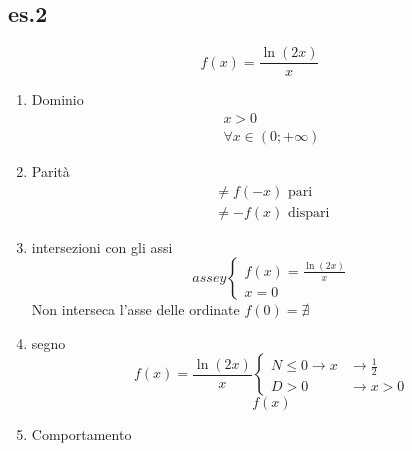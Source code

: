 \documentclass{article}
\begin{document}
	\subsection{es.2}
		\begin{equation*}
			f(x)=\frac{\ln(2x)}{x}
		\end{equation*}
		\begin{enumerate}
			\item Dominio
				\begin{equation*}
					\begin{matrix}
						x>0\\
						\forall x\in (0; +\infty)
					\end{matrix}
				\end{equation*}
			\item Parità
				\begin{equation*}
					\begin{matrix}
						\neq f(-x) \text{ pari}\\
						\neq -f(x) \text{ dispari}
					\end{matrix}
				\end{equation*}
			\item intersezioni con gli assi
				\begin{equation*}
					asse y\begin{cases}
						f(x)=\frac{\ln(2x)}{x}\\
						x=0
					\end{cases}
				\end{equation*}
				Non interseca l'asse delle ordinate $f(0)=\nexists$
			\item segno
				\begin{equation}
					f(x)=\frac{\ln(2x)}{x}\begin{cases}
						N \leq 0 \to x&\to \frac{1}{2}\\
						D > 0 &\to x>0
					\end{cases}
				\end{equation}
				\begin{equation*}
					f(x)
				\end{equation*}
			\item Comportamento 
		\end{enumerate}
\end{document}
